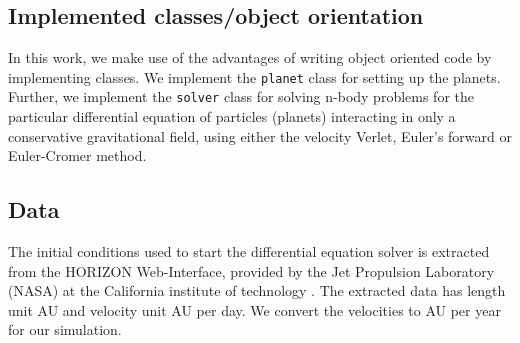 \documentclass[../main.tex]{subfiles}
\begin{document}
\subsection{Implemented classes/object orientation}
In this work, we make use of the advantages of writing object oriented code by implementing classes. We implement the \texttt{planet} class for setting up the planets. Further, we implement the \texttt{solver} class for solving n-body problems for the particular differential equation of particles (planets) interacting in only a conservative gravitational field, using either the velocity Verlet, Euler's forward or Euler-Cromer method. 

\subsection{Data}
The initial conditions used to start the differential equation solver is extracted from the HORIZON Web-Interface, provided by the Jet Propulsion Laboratory (NASA) at the California institute of technology \cite{Horizon}. The extracted data has length unit AU and velocity unit AU per day. We convert the velocities to AU per year for our simulation. 
\end{document}
